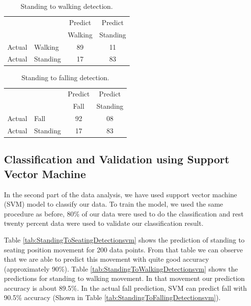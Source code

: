 \documentclass[letterpaper]{article}
\begin{document}
\begin{table}
\caption{Standing to walking detection.}
	\label{tab:StandingToWalkingDetection}
\centering
		\begin{tabular} {l l |c |c}
			& & Predict& Predict \\ 
			& & Walking & Standing \\ \hline
			Actual& Walking & 89 & 11\\ \hline
			Actual& Standing & 17& 83\\ \hline
		\end{tabular}
\end{table}

\begin{table}[!ht]
\caption{Standing to falling detection.}
\label{tab:StandingToFallingDetection}
\centering
		\begin{tabular} {l l |c |c}
			& & Predict& Predict \\ 
			& & Fall & Standing \\ \hline
			Actual& Fall & 92 & 08\\ \hline
			Actual& Standing & 17& 83\\ \hline
		\end{tabular}
\end{table}

\subsection*{Classification and Validation using Support Vector Machine}

In the second part of the data analysis, we have used support vector machine (SVM) model
to classify our data. To train the model, we used the same procedure as before, 80\% of
our data were used to do the classification and rest twenty percent data were used to validate our
classification result.

Table \ref{tab:StandingToSeatingDetectionsvm} shows the prediction of standing to seating position
movement for 200 data points. From that table we can observe that we are able to predict this
movement with quite good accuracy (approximately 90\%). Table
\ref{tab:StandingToWalkingDetectionsvm} shows the predictions for standing to
walking movement. In that movement our prediction accuracy is about 89.5\%. In the actual fall
prediction, SVM can predict fall with 90.5\% accuracy (Shown in Table
\ref{tab:StandingToFallingDetectionsvm}).
\end{document}
